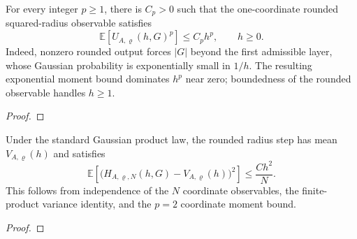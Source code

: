 \begin{lemma}
  \label{lem:subcritical-fixed-moment-bound}
  \leanok
  For every integer $p\geq1$, there is $C_p>0$ such that the one-coordinate
  rounded squared-radius observable satisfies
  \[
    \mathbb E\!\left[U_{A,\varrho}(h,G)^p\right]\leq C_p h^p,
    \qquad h\geq0.
  \]
  Indeed, nonzero rounded output forces $|G|$ beyond the first admissible layer,
  whose Gaussian probability is exponentially small in $1/h$.  The resulting
  exponential moment bound dominates $h^p$ near zero; boundedness of the rounded
  observable handles $h\geq1$.
\end{lemma}
\begin{proof}
  \leanok
\end{proof}

\begin{lemma}
  \label{lem:subcritical-fixed-noise-variance}
  \leanok
  Under the standard Gaussian product law, the rounded radius step has mean
  $V_{A,\varrho}(h)$ and satisfies
  \[
    \mathbb E\!\left[
      \bigl(H_{A,\varrho,N}(h,G)-V_{A,\varrho}(h)\bigr)^2
    \right]
    \leq \frac{C h^2}{N}.
  \]
  This follows from independence of the $N$ coordinate observables, the
  finite-product variance identity, and the $p=2$ coordinate moment bound.
\end{lemma}
\begin{proof}
  \leanok
\end{proof}

